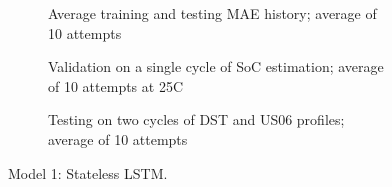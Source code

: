 \begin{figure*}[htbp]
\begin{subfigure}[b]{0.325\textwidth}
        \centering
        
        \caption{Average training and testing MAE history; average of 10 attempts}
    \end{subfigure}
    \hfill
    \begin{subfigure}[b]{0.325\textwidth}
        \centering
        
        \caption{Validation on a single cycle of SoC estimation; average of 10 attempts at 25\textdegree{}C}
    \end{subfigure}
    \hfill
    \begin{subfigure}[b]{0.325\textwidth}
        \centering
        
        \caption{Testing on two cycles of DST and US06 profiles; average of 10 attempts}
    \end{subfigure}
    \caption{Model 1: Stateless LSTM.}
    \label{fig:Model-1res}
\end{figure*}
\clearpage
